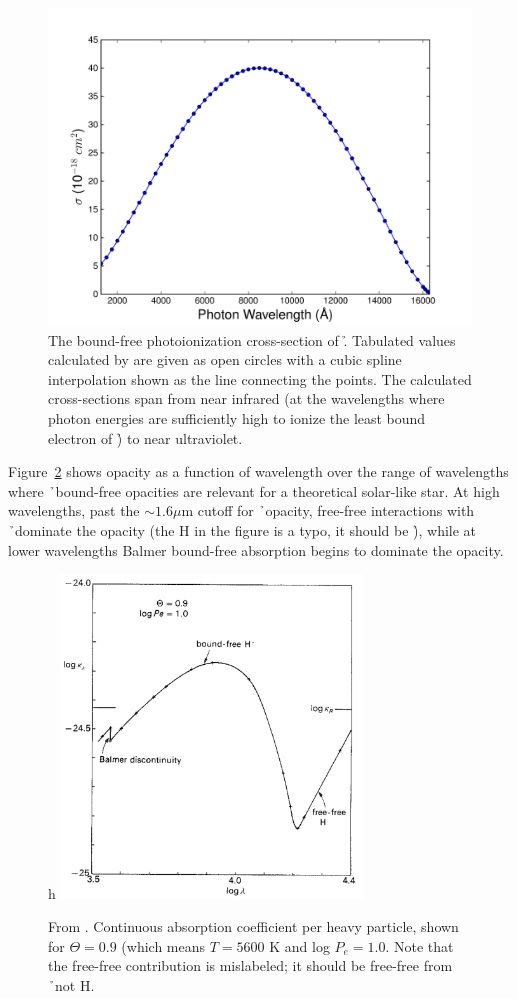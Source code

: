 \begin{figure}
\includegraphics[width=150mm]{figs/rrt.pdf}%
\caption{\label{fig:bfcrosssection}The bound-free photoionization
cross-section of \h. Tabulated values calculated
by \cite{wishart1979} are given as open circles with a cubic spline
interpolation shown as the line connecting the points.  The calculated
cross-sections span from near infrared (at the wavelengths where photon
energies are sufficiently high to ionize the least bound electron
of \h) to near ultraviolet.}
\end{figure}

Figure~\ref{fig:bohmopacity} shows  opacity as a function of wavelength over the range of wavelengths where \h\ bound-free opacities are relevant for a theoretical solar-like star.  At high wavelengths, past the $\sim 1.6 \mu$m cutoff for \h\ opacity, free-free interactions with \h\ dominate the opacity (the H in the figure is a typo, it should be \h), while at lower wavelengths Balmer bound-free absorption begins to dominate the opacity.
\begin{figure}{h}
\includegraphics[width=80mm]{figs/hminusopacity.png}
\caption{\label{fig:bohmopacity}From \cite{boehm1989}. Continuous absorption coefficient per heavy particle, shown for $\Theta=0.9$ (which means $T=5600$ K and log $P_e=1.0$.  Note that the free-free contribution is mislabeled; it should be free-free from \h\ not H.}
\end{figure}


